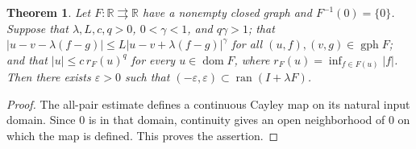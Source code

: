 \documentclass{article}
\newtheorem{theorem}{Theorem}
\begin{document}
\begin{theorem}
Let $F:\mathbb R\rightrightarrows\mathbb R$ have a nonempty closed graph and $F^{-1}(0)=\{0\}$.
Suppose that $\lambda,L,c,q>0$, $0<\gamma<1$, and $q\gamma>1$; that
$|u-v-\lambda(f-g)|\le L|u-v+\lambda(f-g)|^\gamma$
for all $(u,f),(v,g)\in\operatorname{gph}F$; and that
$|u|\le c\,r_F(u)^q$ for every $u\in\operatorname{dom}F$, where $r_F(u)=\inf_{f\in F(u)}|f|$.
Then there exists $\varepsilon>0$ such that $(-\varepsilon,\varepsilon)\subset\operatorname{ran}(I+\lambda F)$.
\end{theorem}
\begin{proof}
The all-pair estimate defines a continuous Cayley map on its natural input domain. Since $0$ is in that domain, continuity gives an open neighborhood of $0$ on which the map is defined. This proves the assertion.
\end{proof}
\end{document}
